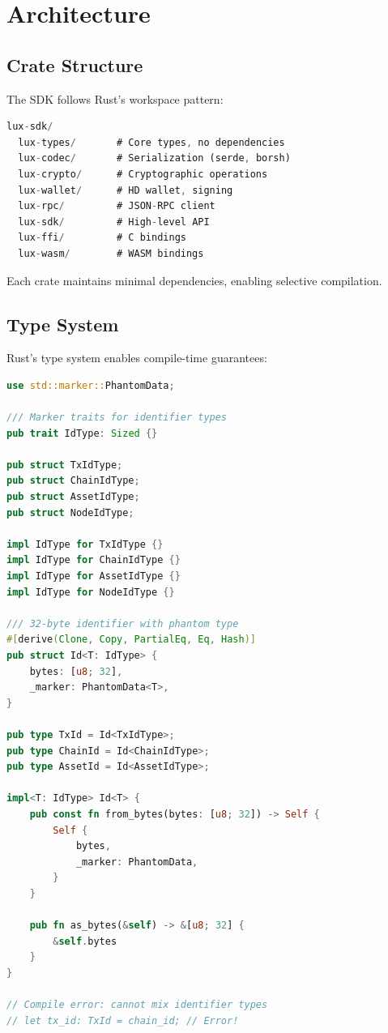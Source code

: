 \documentclass[11pt,twocolumn]{article}
\begin{document}
\section{Architecture}

\subsection{Crate Structure}

The SDK follows Rust's workspace pattern:

\begin{lstlisting}[language=Rust,caption=Workspace Structure]
lux-sdk/
  lux-types/       # Core types, no dependencies
  lux-codec/       # Serialization (serde, borsh)
  lux-crypto/      # Cryptographic operations
  lux-wallet/      # HD wallet, signing
  lux-rpc/         # JSON-RPC client
  lux-sdk/         # High-level API
  lux-ffi/         # C bindings
  lux-wasm/        # WASM bindings
\end{lstlisting}

Each crate maintains minimal dependencies, enabling selective compilation.

\subsection{Type System}

Rust's type system enables compile-time guarantees:

\begin{lstlisting}[language=Rust,caption=Type-Safe Identifiers]
use std::marker::PhantomData;

/// Marker traits for identifier types
pub trait IdType: Sized {}

pub struct TxIdType;
pub struct ChainIdType;
pub struct AssetIdType;
pub struct NodeIdType;

impl IdType for TxIdType {}
impl IdType for ChainIdType {}
impl IdType for AssetIdType {}
impl IdType for NodeIdType {}

/// 32-byte identifier with phantom type
#[derive(Clone, Copy, PartialEq, Eq, Hash)]
pub struct Id<T: IdType> {
    bytes: [u8; 32],
    _marker: PhantomData<T>,
}

pub type TxId = Id<TxIdType>;
pub type ChainId = Id<ChainIdType>;
pub type AssetId = Id<AssetIdType>;

impl<T: IdType> Id<T> {
    pub const fn from_bytes(bytes: [u8; 32]) -> Self {
        Self {
            bytes,
            _marker: PhantomData,
        }
    }

    pub fn as_bytes(&self) -> &[u8; 32] {
        &self.bytes
    }
}

// Compile error: cannot mix identifier types
// let tx_id: TxId = chain_id; // Error!
\end{lstlisting}
\end{document}

